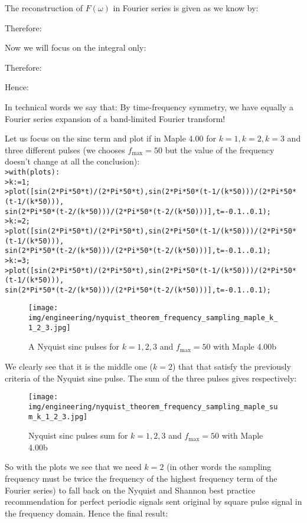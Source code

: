 \begin{dem}
	The reconstruction of $F(\omega)$ in Fourier series is given as we know by:
	
	Therefore:
	
	Now we will focus on the integral only:
	
	Therefore:
	
	Hence:
	
	In technical words we say that: By time-frequency symmetry, we have equally a Fourier series expansion of a band-limited Fourier transform!
	
	Let us focus on the $\mathrm{sinc}$ term and plot if in Maple 4.00 for $k=1,k=2,k=3$ and three different pulses (we chooses $f_\mathrm{max}=50$ but the value of the frequency doesn't change at all the conclusion):\\
	
	\texttt{>with(plots):\\
	>k:=1;\\
	>plot([sin(2*Pi*50*t)/(2*Pi*50*t),sin(2*Pi*50*(t-1/(k*50)))/(2*Pi*50*(t-1/(k*50))),\\
	sin(2*Pi*50*(t-2/(k*50)))/(2*Pi*50*(t-2/(k*50)))],t=-0.1..0.1);\\
	>k:=2;\\
	>plot([sin(2*Pi*50*t)/(2*Pi*50*t),sin(2*Pi*50*(t-1/(k*50)))/(2*Pi*50*(t-1/(k*50))),\\
	sin(2*Pi*50*(t-2/(k*50)))/(2*Pi*50*(t-2/(k*50)))],t=-0.1..0.1);\\
	>k:=3;\\
	>plot([sin(2*Pi*50*t)/(2*Pi*50*t),sin(2*Pi*50*(t-1/(k*50)))/(2*Pi*50*(t-1/(k*50))),\\
	sin(2*Pi*50*(t-2/(k*50)))/(2*Pi*50*(t-2/(k*50)))],t=-0.1..0.1);}
	\begin{figure}[H]
		\centering
		\texttt{[image: img/engineering/nyquist\_theorem\_frequency\_sampling\_maple\_k\_1\_2\_3.jpg]}
		\caption[]{A Nyquist sinc pulses for $k=1,2,3$ and $f_\mathrm{max}=50$ with Maple 4.00b}
	\end{figure}
	We clearly see that it is the middle one ($k=2$) that that satisfy the previously criteria of the Nyquist sine pulse. The sum of the three pulses gives respectively:
	\begin{figure}[H]
		\centering
		\texttt{[image: img/engineering/nyquist\_theorem\_frequency\_sampling\_maple\_sum\_k\_1\_2\_3.jpg]}
		\caption{Nyquist sinc pulses sum for $k=1,2,3$ and $f_\mathrm{max}=50$ with Maple 4.00b}
	\end{figure}
	So with the plots we see that we need $k=2$ (in other words the sampling frequency must be twice the frequency of the highest frequency term of the Fourier series) to fall back on the Nyquist and Shannon best practice recommendation for perfect periodic signals sent original by square pulse signal in the frequency domain. Hence the final result:
	

\end{dem}
